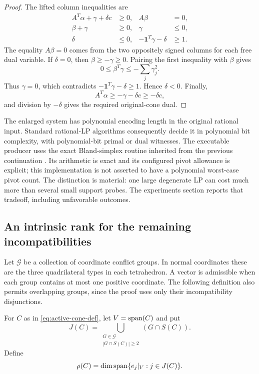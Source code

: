 \begin{proof}
The lifted column inequalities are
\begin{align*}
 A^T\alpha+\gamma+\delta c&\ge0,& A\beta&=0,\\
 \beta+\gamma&\ge0,& \gamma&\le0,\\
 \delta&\le0,&-\mathbf1^T\gamma-\delta&\ge1.
\end{align*}
The equality $A\beta=0$ comes from the two oppositely signed columns for
each free dual variable.  If $\delta=0$, then
$\beta\ge-\gamma\ge0$.  Pairing the first inequality with $\beta$ gives
\[
 0\le\beta^T\gamma\le-\sum_j\gamma_j^2.
\]
Thus $\gamma=0$, which contradicts
$-\mathbf1^T\gamma-\delta\ge1$.  Hence $\delta<0$.  Finally,
\[
 A^T\alpha\ge-\gamma-\delta c\ge-\delta c,
\]
and division by $-\delta$ gives the required original-cone dual.
\end{proof}

The enlarged system has polynomial encoding length in the original rational
input.  Standard rational-LP algorithms consequently decide it in polynomial
bit complexity, with polynomial-bit primal or dual witnesses.  The executable
producer uses the exact Bland-simplex routine inherited from the previous
continuation \cite{priorDual}.  Its arithmetic is exact and its configured
pivot allowance is explicit; this implementation is not asserted to have a
polynomial worst-case pivot count.  The distinction is material: one large
degenerate LP can cost much more than several small support probes.  The
experiments section reports that tradeoff, including unfavorable outcomes.

\subsection{An intrinsic rank for the remaining incompatibilities}

Let $\mathcal G$ be a collection of coordinate conflict groups.  In normal
coordinates these are the three quadrilateral types in each tetrahedron.
A vector is admissible when each group contains at most one positive
coordinate.  The following definition also permits overlapping groups, since
the proof uses only their incompatibility disjunctions.

\begin{definition}\label{def:active-ambiguity}
For $C$ as in \eqref{eq:active-cone-def}, let $V=\operatorname{span}(C)$ and put
\[
 J(C)=\bigcup_{\substack{G\in\mathcal G\\|G\cap S(C)|\ge2}}
             (G\cap S(C)).
\]
Define
\begin{equation}\label{eq:active-rho}
 \rho(C)=\dim\operatorname{span}\{e_j|_V:j\in J(C)\}.
\end{equation}
\end{definition}

